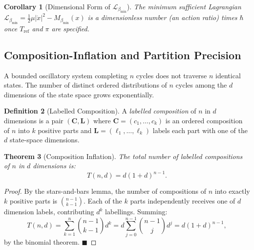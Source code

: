 \documentclass[11pt,twocolumn,a4paper]{article}
\theoremstyle{plain}
\newtheorem{theorem}{Theorem}[section]
\newtheorem{corollary}[theorem]{Corollary}
\theoremstyle{definition}
\newtheorem{definition}[theorem]{Definition}
\theoremstyle{remark}
\newcommand{\bmin}{\beta_{\min}}
\newcommand{\Lmin}{\mathcal{L}_{\bmin}}
\newcommand{\half}{\tfrac{1}{2}}
\renewcommand{\qed}{\hfill$\blacksquare$}
\begin{document}
\begin{corollary}[Dimensional Form of $\Lmin$]
\label{cor:dimlessL}
The minimum sufficient Lagrangian $\Lmin = \half\mu|\dot{x}|^2 - M_{\bmin}(x)$
is a dimensionless number (an action ratio) times $\hbar$ once $T_{\mathrm{ref}}$
and $\pi$ are specified.
\end{corollary}

\subsection{Composition-Inflation and Partition Precision}

A bounded oscillatory system completing $n$ cycles does not traverse $n$
identical states. The number of distinct ordered distributions of $n$ cycles
among the $d$ dimensions of the state space grows exponentially.

\begin{definition}[Labelled Composition]
A \emph{labelled composition} of $n$ in $d$ dimensions is a pair $(\mathbf{C},
\mathbf{L})$ where $\mathbf{C} = (c_1, \ldots, c_k)$ is an ordered composition
of $n$ into $k$ positive parts and $\mathbf{L} = (\ell_1, \ldots, \ell_k)$
labels each part with one of the $d$ state-space dimensions.
\end{definition}

\begin{theorem}[Composition Inflation]
\label{thm:composition}
The total number of labelled compositions of $n$ in $d$ dimensions is:
\[
  T(n, d) = d(1 + d)^{n-1}.
\]
\end{theorem}

\begin{proof}
By the stars-and-bars lemma, the number of compositions of $n$ into exactly $k$
positive parts is $\binom{n-1}{k-1}$. Each of the $k$ parts independently
receives one of $d$ dimension labels, contributing $d^k$ labellings. Summing:
\[
  T(n, d) = \sum_{k=1}^{n}\binom{n-1}{k-1}d^k
  = d\sum_{j=0}^{n-1}\binom{n-1}{j}d^j = d(1+d)^{n-1},
\]
by the binomial theorem. \qed
\end{proof}
\end{document}
